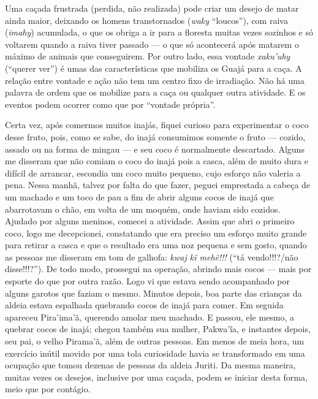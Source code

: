 Uma caçada frustrada (perdida, não realizada) pode criar um desejo de
matar ainda maior, deixando os homens transtornados (\emph{waky}
``loucos''), com raiva (\emph{imahy}) acumulada, o que os obriga a ir para
a floresta muitas vezes sozinhos e só voltarem quando a raiva tiver
passado --- o que só acontecerá após matarem o máximo de animais que
conseguirem. Por outro lado, essa vontade \emph{xaku'uhy} (``querer ver'')
é umas das características que mobiliza os Guajá para a caça. A relação
entre vontade e ação não tem um centro fixo de irradiação. Não há uma
palavra de ordem que os mobilize para a caça ou qualquer outra
atividade. E os eventos podem ocorrer como que por ``vontade própria''.

Certa vez, após comermos muitos inajás, fiquei curioso para experimentar
o coco desse fruto, pois, como se sabe, do inajá consumimos somente o
fruto --- cozido, assado ou na forma de mingau --- e seu coco é normalmente
descartado. Alguns me disseram que não comiam o coco do inajá pois a
casca, além de muito dura e difícil de arrancar, escondia um coco muito
pequeno, cujo esforço não valeria a pena. Nessa manhã, talvez por falta
do que fazer, peguei emprestada a cabeça de um machado e um toco de pau
a fim de abrir alguns cocos de inajá que abarrotavam o chão, em volta de
um moquém, onde haviam sido cozidos. Ajudado por alguns meninos, comecei
a atividade. Assim que abri o primeiro coco, logo me decepcionei,
constatando que era preciso um esforço muito grande para retirar a casca
e que o resultado era uma noz pequena e sem gosto, quando as pessoas me
disseram em tom de galhofa: \emph{kwaj kĩ mehẽ!!!} (``tá vendo!!!?/não
disse!!!?''). De todo modo, prossegui na operação, abrindo mais cocos ---
mais por esporte do que por outra razão. Logo vi que estava sendo
acompanhado por alguns garotos que faziam o mesmo. Minutos depois, boa
parte das crianças da aldeia estava espalhada quebrando cocos de inajá
para comer. Em seguida apareceu Pira'ima'ã, querendo amolar meu machado.
E passou, ele mesmo, a quebrar cocos de inajá; chegou também sua mulher,
Pakwa'ĩa, e instantes depois, seu pai, o velho Pirama'ã, além de outras
pessoas. Em menos de meia hora, um exercício inútil movido por uma tola
curiosidade havia se transformado em uma ocupação que tomou dezenas de
pessoas da aldeia Juriti. Da mesma maneira, muitas vezes os desejos,
inclusive por uma caçada, podem se iniciar desta forma, meio que por
contágio.


